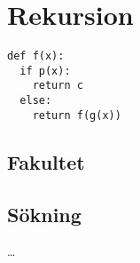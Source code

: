 \mode*

\section{Rekursion}

\begin{frame}[fragile]
  \begin{lstlisting}[basicstyle=\huge,numbers=none]
def f(x):
  if p(x):
    return c
  else:
    return f(g(x))
  \end{lstlisting}
\end{frame}

\subsection{Fakultet}

\begin{frame}[fragile]
  \begin{example}
    
  \end{example}
\end{frame}

\begin{frame}[fragile]
  \begin{example}
    
  \end{example}
\end{frame}

\subsection{Sökning}

\begin{frame}[fragile]
  \begin{example}
    
  \end{example}
\end{frame}

\begin{frame}[fragile]
  \begin{example}
    
    \dots
    
  \end{example}
\end{frame}



